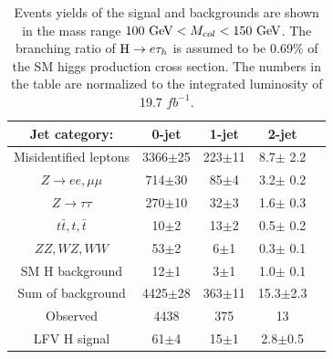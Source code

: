 \begin{table}[htbp]
\centering
\caption{Events yields of the signal and backgrounds are shown in the mass range $100~\textrm{GeV}<M_{col}<150~\textrm{GeV}$. The branching ratio of $\mathrm{H} \to e \tau_{h}$ is assumed to be 0.69\% of the SM higgs production cross section. The numbers in the table are normalized to the integrated luminosity of 19.7 $fb^{-1}$.}\label{tab:EventYieldTable_100_to_150} 
\begin{tabular}{c|cccl}\hline
Jet category:                     &    0-jet    & 1-jet          & 2-jet          \\\hline
Misidentified leptons           &     3366$\pm$25      & 223$\pm$11     &  8.7$\pm$ 2.2  \\
$Z\to e e, \mu\mu$    &  714$\pm$30       & 85$\pm$4       &  3.2$\pm$ 0.2  \\
$Z\to \tau\tau$           &      270$\pm$10       & 32$\pm$3       &  1.6$\pm$ 0.3  \\
$t\bar{t},t,\bar{t}$      &  10$\pm$2        &  13$\pm$2      &  0.5$\pm$ 0.2   \\
$ ZZ, WZ, WW$        &             53$\pm$2         &  6$\pm$1       &  0.3$\pm$ 0.1   \\
SM H  background     &                12$\pm$1         &  3$\pm$1       &  1.0$\pm$ 0.1   \\
Sum of background       &               4425$\pm$28      & 363$\pm$11     &  15.3$\pm$2.3   \\\hline
Observed                   &            4438             & 375            & 13            \\ \hline
LFV H  signal             &           61$\pm$4        & 15$\pm$1       &  2.8$\pm$0.5    \\\hline
\end{tabular}
\end{table}



